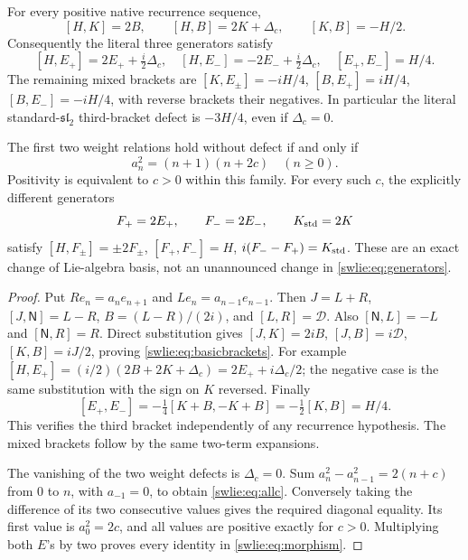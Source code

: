 \begin{swlietheorem}\label{swlie:thm:brackets}
For every positive native recurrence sequence,
\begin{equation}\label{swlie:eq:basicbrackets}
 [H,K]=2B,\qquad [H,B]=2K+\Delta_c,\qquad [K,B]=-H/2.
\end{equation}
Consequently the literal three generators satisfy
\begin{equation}\label{swlie:eq:literalbrackets}
 \boxed{
 [H,E_+]=2E_++\tfrac i2\Delta_c,\quad
 [H,E_-]=-2E_-+\tfrac i2\Delta_c,\quad
 [E_+,E_-]=H/4.}
\end{equation}
The remaining mixed brackets are
$[K,E_\pm]=-iH/4$, $[B,E_+]=iH/4$,
$[B,E_-]=-iH/4$, with reverse brackets their negatives.
In particular the literal standard-$\mathfrak{sl}_2$
third-bracket defect is $-3H/4$, even if $\Delta_c=0$.

The first two weight relations hold without defect if and only if
\begin{equation}\label{swlie:eq:allc}
 a_n^2=(n+1)(n+2c)\quad(n\geq0).
\end{equation}
Positivity is equivalent to $c>0$ within this family.
For every such $c$, the explicitly different generators
\begin{equation}\label{swlie:eq:morphism}
 F_+=2E_+,\qquad F_-=2E_-,\qquad K_{\rm std}=2K
\end{equation}
satisfy
$[H,F_\pm]=\pm2F_\pm$, $[F_+,F_-]=H$,
$i(F_--F_+)=K_{\rm std}$.
These are an exact change of Lie-algebra basis, not an
unannounced change in \eqref{swlie:eq:generators}.
\end{swlietheorem}
\begin{proof}
Put $Re_n=a_ne_{n+1}$ and $Le_n=a_{n-1}e_{n-1}$.
Then $J=L+R$, $[J,\mathsf N]=L-R$,
$B=(L-R)/(2i)$, and $[L,R]=\mathcal D$.
Also $[\mathsf N,L]=-L$ and $[\mathsf N,R]=R$.
Direct substitution gives $[J,K]=2iB$,
$[J,B]=i\mathcal D$, $[K,B]=iJ/2$, proving
\eqref{swlie:eq:basicbrackets}. For example
$[H,E_+]=(i/2)(2B+2K+\Delta_c)
 =2E_++i\Delta_c/2$; the negative case is the same
substitution with the sign on $K$ reversed.
Finally
\[
 [E_+,E_-]=-\tfrac14[K+B,-K+B]
          =-\tfrac12[K,B]=H/4.
\]
This verifies the third bracket independently of any
recurrence hypothesis. The mixed brackets follow by the
same two-term expansions.

The vanishing of the two weight defects is $\Delta_c=0$.
Sum $a_n^2-a_{n-1}^2=2(n+c)$ from $0$ to $n$, with
$a_{-1}=0$, to obtain \eqref{swlie:eq:allc}. Conversely taking
the difference of its two consecutive values gives
the required diagonal equality. Its first value is
$a_0^2=2c$, and all values are positive exactly for $c>0$.
Multiplying both $E$'s by two proves every identity
in \eqref{swlie:eq:morphism}.
\end{proof}

